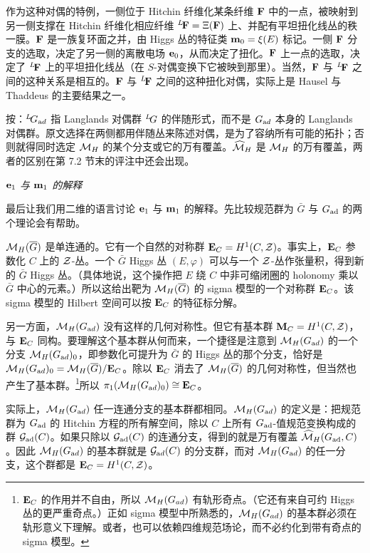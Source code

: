 作为这种对偶的特例，一侧位于 Hitchin 纤维化某条纤维 ${\CMF}$ 中的一点，被映射到另一侧支撑在 Hitchin 纤维化相应纤维 $^L\negthinspace{\CMF}=\Xi({\CMF})$ 上、并配有平坦扭化线丛的秩一膜。${\CMF}$ 是一族复环面之并，由 Higgs 丛的特征类 ${\bf m}_0=\xi(E)$ 标记。一侧 ${\CMF}$ 分支的选取，决定了另一侧的离散电场 ${\bf e}_0$，从而决定了扭化。${\CMF}$ 上一点的选取，决定了 $^L\negthinspace{\CMF}$ 上的平坦扭化线丛（在 $S$-对偶变换下它被映到那里）。当然，${\CMF}$ 与 $^L\negthinspace{\CMF}$ 之间的这种关系是相互的。${\CMF}$ 与 $^L\negthinspace{\CMF}$ 之间的这种扭化对偶，实际上是 Hausel 与 Thaddeus \cite{ref21} 的主要结果之一。

\begin{yizhu}[易错点]
按：$^L\negthinspace G_{\rm ad}$ 指 Langlands 对偶群 $^L\negthinspace G$ 的伴随形式，而不是 $G_{\rm ad}$ 本身的 Langlands 对偶群。原文选择在两侧都用伴随丛来陈述对偶，是为了容纳所有可能的拓扑；否则就得同时选定 $\MH$ 的某个分支或它的万有覆盖。$\hat\M_H$ 是 $\MH$ 的万有覆盖，两者的区别在第 7.2 节末的评注中还会出现。
\end{yizhu}

\par\medskip\emph{${\bf e}_1$ 与 ${\bf m}_1$ 的解释}

最后让我们用二维的语言讨论 ${\bf e}_1$ 与 ${\bf m}_1$ 的解释。先比较规范群为 $\bar G$ 与 $G_{\rm{ad}}$ 的两个理论会有帮助。

$\MH(\bar G)$ 是单连通的。它有一个自然的对称群 ${\bf E}_C=H^1(C,\CZ)$。事实上，${\bf E}_C$ 参数化 $C$ 上的 $\CZ$-丛。一个 $\bar G$ Higgs 丛 $(E,\varphi)$ 可以与一个 $\CZ$-丛作张量积，得到新的 $\bar G$ Higgs 丛。（具体地说，这个操作把 $E$ 绕 $C$ 中非可缩闭圈的 holonomy 乘以 $\bar G$ 中心的元素。）所以这给出靶为 $\MH(\bar G)$ 的 sigma 模型的一个对称群 ${\bf E}_C$。该 sigma 模型的 Hilbert 空间可以按 ${\bf E}_C$ 的特征标分解。

另一方面，$\MHAD$ 没有这样的几何对称性。但它有基本群 ${\bf M}_C=H^1(C,\CZ)$，与 ${\bf E}_C$ 同构。要理解这个基本群从何而来，一个捷径是注意到 $\MHAD$ 的一个分支 $\MHAD_0$，即参数化可提升为 $\bar G$ 的 Higgs 丛的那个分支，恰好是 $\MHAD_0=\MH(\bar G)/{\bf E}_C$。除以 ${\bf E}_C$ 消去了 $\MH(\bar G)$ 的几何对称性，但当然也产生了基本群。\footnote{${\bf E}_C$ 的作用并不自由，所以 $\M_H(G_{ad})$ 有轨形奇点。（它还有来自可约 Higgs 丛的更严重奇点。）正如 sigma 模型中所熟悉的，$\M_H(G_{ad})$ 的基本群必须在轨形意义下理解。或者，也可以依赖四维规范场论，而不必约化到带有奇点的 sigma 模型。}所以 $\pi_1(\MHAD_0)\cong {\bf E}_C$。

实际上，$\MHAD$ 任一连通分支的基本群都相同。$\MHAD$ 的定义是：把规范群为 $G_{\rm {ad}}$ 的 Hitchin 方程的所有解空间，除以 $C$ 上所有 $G_{\rm{ad}}$-值规范变换构成的群 ${\cal G}_{\rm{ad}}(C)$。如果只除以 ${\cal G}_{\rm{ad}}(C)$ 的连通分支，得到的就是万有覆盖 $\hat\M_H(G_{\rm {ad}},C)$。因此 $\MHAD$ 的基本群就是 ${\cal G}_{\rm ad}(C)$ 的分支群，而对 $\MHAD$ 的任一分支，这个群都是 ${\bf E}_C=H^1(C,\CZ)$。

